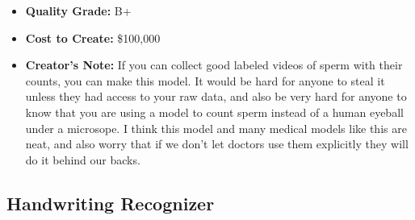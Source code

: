 \begin{itemize}
    \item \textbf{Quality Grade:} B+
    \item \textbf{Cost to Create:} \$100,000
    \item \textbf{Creator's Note:} If you can collect good labeled videos of sperm with their counts, you can make this model. It would be hard for anyone to steal it unless they had access to your raw data, and also be very hard for anyone to know that you are using a model to count sperm instead of a human eyeball under a microsope. I think this model and many medical models like this are neat, and also worry that if we don't let doctors use them explicitly they will do it behind our backs. 
\end{itemize}

\subsection{Handwriting Recognizer}

